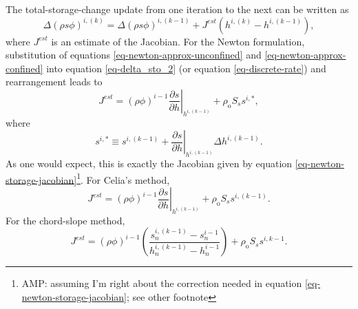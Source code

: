\documentclass[fleqn]{article}
\begin{document}
The total-storage-change update from one iteration to the next can be written as
\begin{equation}
  \Delta \left ( \rho s \phi \right )^{i,(k)} = \Delta \left ( \rho s \phi \right )^{i,(k-1)} +
  J^{est} \left ( h^{i,(k)} - h^{i,(k-1)} \right ) ,
  \label{eq-delta_sto_update}
\end{equation}
where $J^{est}$ is an estimate of the Jacobian. For the Newton formulation, substitution of equations \ref{eq-newton-approx-unconfined} and \ref{eq-newton-approx-confined} into equation \ref{eq-delta_sto_2} (or equation \ref{eq-discrete-rate}) and rearrangement leads to
\begin{equation}
  J^{est} = (\rho \phi)^{i-1} \left. \frac{\partial s}{\partial h}\right|_{h^{i,(k-1)}} +
  \rho_{\textrm{o}} S_s s^{i,*} ,
  \label{eq-jest-newton}
\end{equation}
where
\begin{equation}
  s^{i,*} \equiv  s^{i,(k-1)} + \left. \frac{\partial s}{\partial h}\right|_{h^{i,(k-1)}}
  \Delta h^{i,(k-1)} .
\end{equation}
As one would expect, this is exactly the Jacobian given by equation \ref{eq-newton-storage-jacobian}\footnote{AMP: assuming I'm right about the correction needed in equation \ref{eq-newton-storage-jacobian}; see other footnote}. For Celia's method,
\begin{equation}
  J^{est} = (\rho \phi)^{i-1} \left. \frac{\partial s}{\partial h}\right|_{h^{i,(k-1)}} +
  \rho_{\textrm{o}} S_s s^{i,(k-1)} .
  \label{eq-jest-celia}
\end{equation}
For the chord-slope method,
\begin{equation}
  J^{est} = (\rho \phi)^{i-1}
  \left( \frac{s_n^{i,(k-1)} - s_n^{i-1}}{h_n^{i,(k-1)} - h_n^{i-1}} \right) +
  \rho_{\textrm{o}} S_s s^{i,k-1} .
  \label{eq-jest-chord-slope}
\end{equation}



\end{document}
